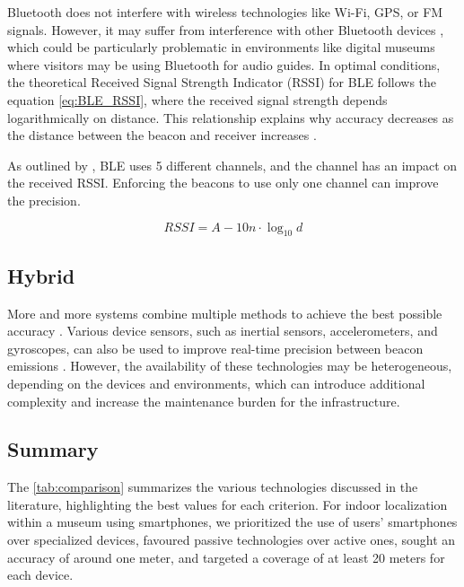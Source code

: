 Bluetooth does not interfere with wireless technologies like Wi-Fi, GPS, or FM signals. However, it may suffer from interference with other Bluetooth devices \cite{spachos_ble_2020}, which could be particularly problematic in environments like digital museums where visitors may be using Bluetooth for audio guides. In optimal conditions, the theoretical Received Signal Strength Indicator (RSSI) for BLE follows the equation \ref{eq:BLE_RSSI}, where the received signal strength depends logarithmically on distance. This relationship explains why accuracy decreases as the distance between the beacon and receiver increases \cite{spachos_ble_2020}. 

As outlined by \cite{barsocchi_detecting_2021}, BLE uses 5 different channels, and the channel has an impact on the received RSSI. Enforcing the beacons to use only one channel can improve the precision.  

\begin{equation} \label{eq:BLE_RSSI}
    RSSI = A - 10n \cdot \log_{10}d
\end{equation}

\subsection{Hybrid}

More and more systems combine multiple methods to achieve the best possible accuracy \cite{shang_overview_2022}. Various device sensors, such as inertial sensors, accelerometers, and gyroscopes, can also be used to improve real-time precision between beacon emissions \cite{ali_locali_2017}. However, the availability of these technologies may be heterogeneous, depending on the devices and environments, which can introduce additional complexity and increase the maintenance burden for the infrastructure.

\subsection{Summary}

The \autoref{tab:comparison} summarizes the various technologies discussed in the literature, highlighting the best values for each criterion. For indoor localization within a museum using smartphones, we prioritized the use of users' smartphones over specialized devices, favoured passive technologies over active ones, sought an accuracy of around one meter, and targeted a coverage of at least 20 meters for each device.  

